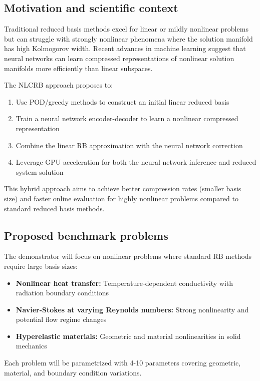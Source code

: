 \subsection{Motivation and scientific context}

Traditional reduced basis methods excel for linear or mildly nonlinear problems but can struggle with strongly nonlinear phenomena where the solution manifold has high Kolmogorov width. Recent advances in machine learning suggest that neural networks can learn compressed representations of nonlinear solution manifolds more efficiently than linear subspaces.

The NLCRB approach proposes to:
\begin{enumerate}
\item Use POD/greedy methods to construct an initial linear reduced basis
\item Train a neural network encoder-decoder to learn a nonlinear compressed representation
\item Combine the linear RB approximation with the neural network correction
\item Leverage GPU acceleration for both the neural network inference and reduced system solution
\end{enumerate}

This hybrid approach aims to achieve better compression rates (smaller basis size) and faster online evaluation for highly nonlinear problems compared to standard reduced basis methods.



\subsection{Proposed benchmark problems}

The demonstrator will focus on nonlinear problems where standard RB methods require large basis sizes:

\begin{itemize}
\item \textbf{Nonlinear heat transfer:} Temperature-dependent conductivity with radiation boundary conditions
\item \textbf{Navier-Stokes at varying Reynolds numbers:} Strong nonlinearity and potential flow regime changes
\item \textbf{Hyperelastic materials:} Geometric and material nonlinearities in solid mechanics
\end{itemize}

Each problem will be parametrized with 4-10 parameters covering geometric, material, and boundary condition variations.



